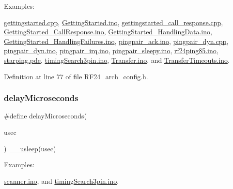 \begin{Desc}
\item[Examples\+: ]\par
\hyperlink{gettingstarted_8cpp-example}{gettingstarted.\+cpp}, \hyperlink{GettingStarted_8ino-example}{Getting\+Started.\+ino}, \hyperlink{gettingstarted_call_response_8cpp-example}{gettingstarted\+\_\+call\+\_\+response.\+cpp}, \hyperlink{GettingStarted_CallResponse_8ino-example}{Getting\+Started\+\_\+\+Call\+Response.\+ino}, \hyperlink{GettingStarted_HandlingData_8ino-example}{Getting\+Started\+\_\+\+Handling\+Data.\+ino}, \hyperlink{GettingStarted_HandlingFailures_8ino-example}{Getting\+Started\+\_\+\+Handling\+Failures.\+ino}, \hyperlink{pingpair_ack_8ino-example}{pingpair\+\_\+ack.\+ino}, \hyperlink{pingpair_dyn_8cpp-example}{pingpair\+\_\+dyn.\+cpp}, \hyperlink{pingpair_dyn_8ino-example}{pingpair\+\_\+dyn.\+ino}, \hyperlink{pingpair_irq_8ino-example}{pingpair\+\_\+irq.\+ino}, \hyperlink{pingpair_sleepy_8ino-example}{pingpair\+\_\+sleepy.\+ino}, \hyperlink{rf24ping85_8ino-example}{rf24ping85.\+ino}, \hyperlink{starping_8pde-example}{starping.\+pde}, \hyperlink{timingSearch3pin_8ino-example}{timing\+Search3pin.\+ino}, \hyperlink{Transfer_8ino-example}{Transfer.\+ino}, and \hyperlink{TransferTimeouts_8ino-example}{Transfer\+Timeouts.\+ino}.\end{Desc}


Definition at line 77 of file R\+F24\+\_\+arch\+\_\+config.\+h.

\mbox{\label{group__Porting__General_ga9384257bf5d5c1aae675b22cc3ecb91a}} 
\subsubsection{\texorpdfstring{delay\+Microseconds}{delayMicroseconds}}
{\footnotesize\ttfamily \#define delay\+Microseconds(\begin{DoxyParamCaption}\item[{}]{usec }\end{DoxyParamCaption})~\hyperlink{group__Porting__Timing_gaec87320f2886551c012814de85713681}{\+\_\+\+\_\+usleep}(usec)}

\begin{Desc}
\item[Examples\+: ]\par
\hyperlink{scanner_8ino-example}{scanner.\+ino}, and \hyperlink{timingSearch3pin_8ino-example}{timing\+Search3pin.\+ino}.\end{Desc}


